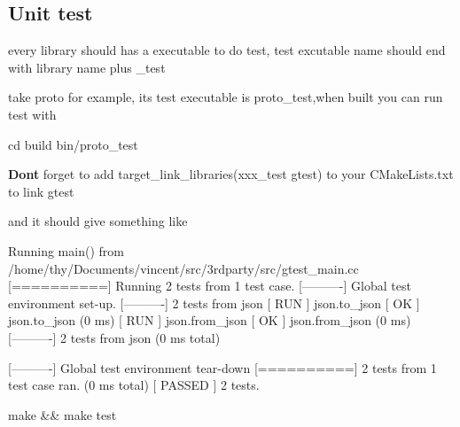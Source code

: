 \subsection*{Unit test}

every library should has a executable to do test, test excutable name should end with library name plus {\ttfamily \+\_\+test}

take {\ttfamily proto} for example, its test executable is {\ttfamily proto\+\_\+test},when built you can run test with 
\begin{DoxyCode}
cd build
bin/proto\_test
\end{DoxyCode}
 {\bfseries Don\textquotesingle{}t} forget to add {\ttfamily target\+\_\+link\+\_\+libraries(xxx\+\_\+test gtest)} to your {\ttfamily C\+Make\+Lists.\+txt} to link {\ttfamily gtest}

and it should give something like 
\begin{DoxyCode}
Running main() from /home/thy/Documents/vincent/src/3rdparty/src/gtest\_main.cc
[==========] Running 2 tests from 1 test case.
[----------] Global test environment set-up.
[----------] 2 tests from json
[ RUN      ] json.to\_json
[       OK ] json.to\_json (0 ms)
[ RUN      ] json.from\_json
[       OK ] json.from\_json (0 ms)
[----------] 2 tests from json (0 ms total)

[----------] Global test environment tear-down
[==========] 2 tests from 1 test case ran. (0 ms total)
[  PASSED  ] 2 tests.
\end{DoxyCode}


{\ttfamily make \&\& make test}


 